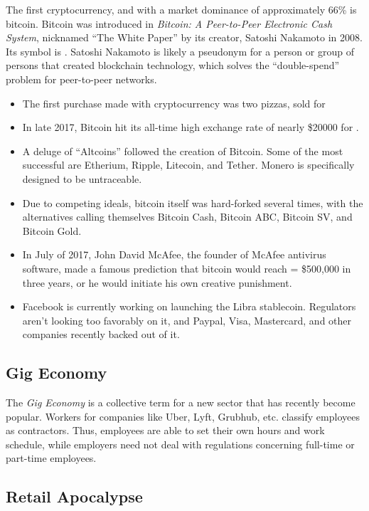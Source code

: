 		The first cryptocurrency, and with a market dominance of approximately 66\% is bitcoin.  Bitcoin was introduced in \textit{Bitcoin: A Peer-to-Peer Electronic Cash System}, nicknamed ``The White Paper'' by its creator, Satoshi Nakamoto in 2008.   Its symbol is \bitcoinA.  Satoshi Nakamoto is likely a pseudonym for a person or group of persons that created blockchain technology, which solves the ``double-spend'' problem for peer-to-peer networks.  
		\begin{itemize} 
			\item The first purchase made with cryptocurrency was two pizzas, sold for  
			\item In late 2017, Bitcoin hit its all-time high exchange rate of nearly \$20000 for . 
			\item A deluge of ``Altcoins'' followed the creation of Bitcoin.  Some of the most successful are Etherium, Ripple, Litecoin, and Tether.  Monero is specifically designed to be untraceable.
			\item Due to competing ideals, bitcoin itself was hard-forked several times, with the alternatives calling themselves Bitcoin Cash, Bitcoin ABC, Bitcoin SV, and Bitcoin Gold.  
			\item In July of 2017, John David McAfee, the founder of McAfee antivirus software, made a famous prediction that bitcoin would reach  = \$500,000 in three years, or he would initiate his own creative punishment.  
			\item Facebook is currently working on launching the Libra stablecoin.  Regulators aren't looking too favorably on it, and Paypal, Visa, Mastercard, and other companies recently backed out of it.
			
		\end{itemize}
		\subsection{Gig Economy}
		The \textit{Gig Economy} is a collective term for a new sector that has recently become popular.  Workers for companies like Uber, Lyft, Grubhub, etc. classify employees as contractors.  Thus, employees are able to set their own hours and work schedule, while employers need not deal with regulations concerning full-time or part-time employees.  
		
		\subsection{Retail Apocalypse}
		
